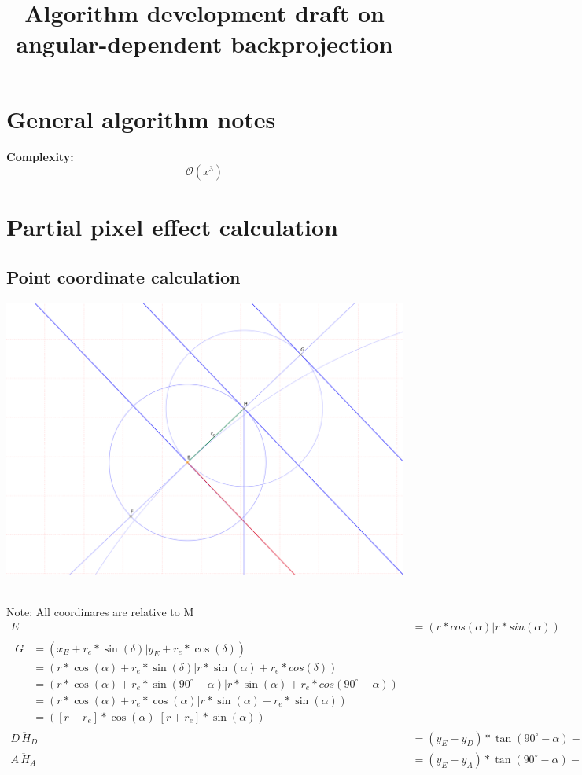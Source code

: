 \documentclass[a4paper,10pt,fleqn]{scrartcl}
\date{}
\title{Algorithm development draft on angular-dependent backprojection}
\numberwithin{equation}{subsection}
\begin{document}
\maketitle\newpage
\section{General algorithm notes}
\textbf{Complexity:}
\begin{equation*}
\mathcal{O}(x^3)
\end{equation*}
\section{Partial pixel effect calculation}
\subsection{Point coordinate calculation}
\begin{minipage}{\textwidth}
\includegraphics[width=\textwidth]{mappicschema}
\end{minipage}\\
\textrm{Note: All coordinares are relative to M}\\
\begin{align}
E &= (r * cos(\alpha) | r * sin(\alpha)) \\
\begin{split}
G &= (x_E + r_e * \sin(\delta) | y_E + r_e * \cos(\delta)) \\
  &= (r * \cos(\alpha) + r_e * \sin(\delta) | r * \sin(\alpha) + r_e * cos(\delta))\\
  &= (r * \cos(\alpha) + r_e * \sin(90^\circ - \alpha) | r * \sin(\alpha) + r_e * cos(90^\circ - \alpha))\\
  &= (r * \cos(\alpha) + r_e * \cos(\alpha) | r * \sin(\alpha) + r_e * \sin(\alpha))\\
  &= ([r + r_e] * \cos(\alpha) | [r + r_e] * \sin(\alpha))
\end{split}\\
\overline{D\,H_D} &= (y_E - y_D) * \tan(90^\circ-\alpha) - x_G - x_D \\
\overline{A\,H_A} &= (y_E - y_A) * \tan(90^\circ-\alpha) - x_G - x_A
\end{align}
\newpage
%
\end{document}

